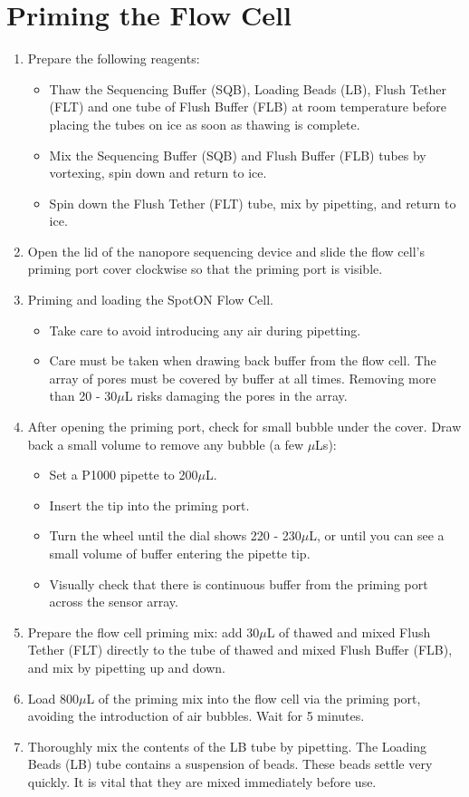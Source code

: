 \section{Priming the Flow Cell}
\begin{enumerate}
	\item Prepare the following reagents:
	\begin{itemize}
		\item Thaw the Sequencing Buffer (SQB), Loading Beads (LB), Flush Tether (FLT) and one tube of Flush Buffer (FLB) at room temperature before placing the tubes on ice as soon as thawing is complete.
		\item Mix the Sequencing Buffer (SQB) and Flush Buffer (FLB) tubes by vortexing, spin down and return to ice.
		\item Spin down the Flush Tether (FLT) tube, mix by pipetting, and return to ice.
	\end{itemize}
	\item Open the lid of the nanopore sequencing device and slide the flow cell's priming port cover clockwise so that the priming port is visible.
	\item Priming and loading the SpotON Flow Cell.
	\begin{itemize}
		\item Take care to avoid introducing any air during pipetting.
		\item Care must be taken when drawing back buffer from the flow cell. The array of pores must be covered by buffer at all times. Removing more than 20 - 30$\mu$L risks damaging the pores in the array.
	\end{itemize}
	\item After opening the priming port, check for small bubble under the cover. Draw back a small volume to remove any bubble (a few $\mu$Ls):
	\begin{itemize}
		\item Set a P1000 pipette to 200$\mu$L.
		\item Insert the tip into the priming port.
		\item Turn the wheel until the dial shows 220 - 230$\mu$L, or until you can see a small volume of buffer entering the pipette tip.
		\item Visually check that there is continuous buffer from the priming port across the sensor array.
	\end{itemize}
	\item Prepare the flow cell priming mix: add 30$\mu$L of thawed and mixed Flush Tether (FLT) directly to the tube of thawed and mixed Flush Buffer (FLB), and mix by pipetting up and down.
	\item Load 800$\mu$L of the priming mix into the flow cell via the priming port, avoiding the introduction of air bubbles. Wait for 5 minutes.
	\item Thoroughly mix the contents of the LB tube by pipetting. The Loading Beads (LB) tube contains a suspension of beads. These beads settle very quickly. It is vital that they are mixed immediately before use.
\end{enumerate}

